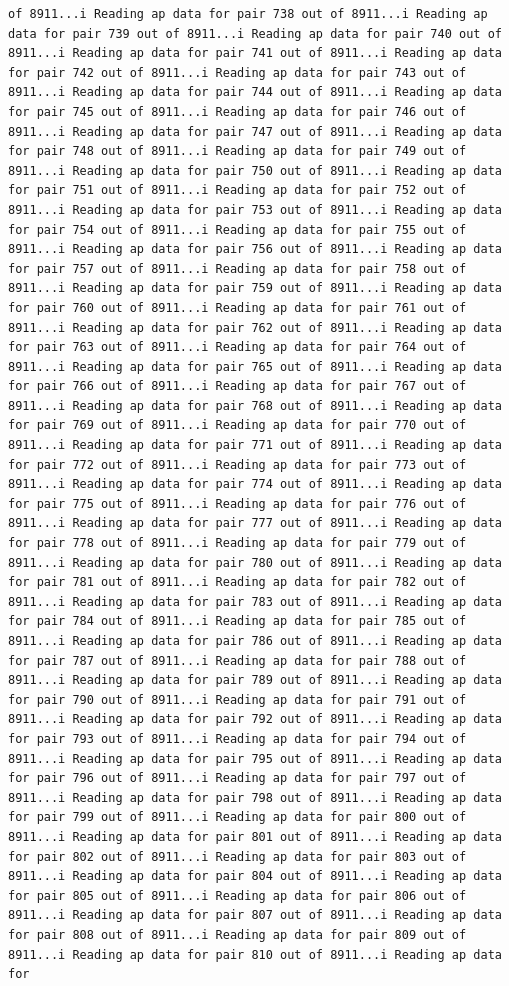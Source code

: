 \documentclass[
]{article}
\begin{document}
\begin{verbatim}
of 8911...i Reading ap data for pair 738 out of 8911...i Reading ap data for pair 739 out of 8911...i Reading ap data for pair 740 out of 8911...i Reading ap data for pair 741 out of 8911...i Reading ap data for pair 742 out of 8911...i Reading ap data for pair 743 out of 8911...i Reading ap data for pair 744 out of 8911...i Reading ap data for pair 745 out of 8911...i Reading ap data for pair 746 out of 8911...i Reading ap data for pair 747 out of 8911...i Reading ap data for pair 748 out of 8911...i Reading ap data for pair 749 out of 8911...i Reading ap data for pair 750 out of 8911...i Reading ap data for pair 751 out of 8911...i Reading ap data for pair 752 out of 8911...i Reading ap data for pair 753 out of 8911...i Reading ap data for pair 754 out of 8911...i Reading ap data for pair 755 out of 8911...i Reading ap data for pair 756 out of 8911...i Reading ap data for pair 757 out of 8911...i Reading ap data for pair 758 out of 8911...i Reading ap data for pair 759 out of 8911...i Reading ap data for pair 760 out of 8911...i Reading ap data for pair 761 out of 8911...i Reading ap data for pair 762 out of 8911...i Reading ap data for pair 763 out of 8911...i Reading ap data for pair 764 out of 8911...i Reading ap data for pair 765 out of 8911...i Reading ap data for pair 766 out of 8911...i Reading ap data for pair 767 out of 8911...i Reading ap data for pair 768 out of 8911...i Reading ap data for pair 769 out of 8911...i Reading ap data for pair 770 out of 8911...i Reading ap data for pair 771 out of 8911...i Reading ap data for pair 772 out of 8911...i Reading ap data for pair 773 out of 8911...i Reading ap data for pair 774 out of 8911...i Reading ap data for pair 775 out of 8911...i Reading ap data for pair 776 out of 8911...i Reading ap data for pair 777 out of 8911...i Reading ap data for pair 778 out of 8911...i Reading ap data for pair 779 out of 8911...i Reading ap data for pair 780 out of 8911...i Reading ap data for pair 781 out of 8911...i Reading ap data for pair 782 out of 8911...i Reading ap data for pair 783 out of 8911...i Reading ap data for pair 784 out of 8911...i Reading ap data for pair 785 out of 8911...i Reading ap data for pair 786 out of 8911...i Reading ap data for pair 787 out of 8911...i Reading ap data for pair 788 out of 8911...i Reading ap data for pair 789 out of 8911...i Reading ap data for pair 790 out of 8911...i Reading ap data for pair 791 out of 8911...i Reading ap data for pair 792 out of 8911...i Reading ap data for pair 793 out of 8911...i Reading ap data for pair 794 out of 8911...i Reading ap data for pair 795 out of 8911...i Reading ap data for pair 796 out of 8911...i Reading ap data for pair 797 out of 8911...i Reading ap data for pair 798 out of 8911...i Reading ap data for pair 799 out of 8911...i Reading ap data for pair 800 out of 8911...i Reading ap data for pair 801 out of 8911...i Reading ap data for pair 802 out of 8911...i Reading ap data for pair 803 out of 8911...i Reading ap data for pair 804 out of 8911...i Reading ap data for pair 805 out of 8911...i Reading ap data for pair 806 out of 8911...i Reading ap data for pair 807 out of 8911...i Reading ap data for pair 808 out of 8911...i Reading ap data for pair 809 out of 8911...i Reading ap data for pair 810 out of 8911...i Reading ap data for 
\end{verbatim}
\end{document}
